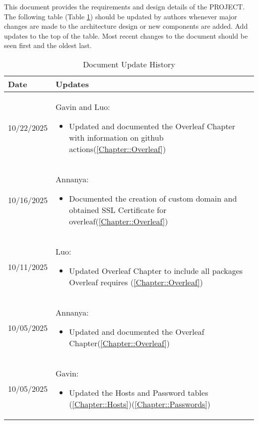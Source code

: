 This document provides the requirements and design details of the
PROJECT.  The following table (Table \ref{Table::UpdateHistory}) should be
updated by authors whenever major changes are made to the architecture
design or new components are added. Add updates to the top of the table.  
Most recent changes to the document should be seen first and the oldest 
last.

\begin{longtable}{|l||p{13.5cm}|}
\caption{Document Update History \label{Table::UpdateHistory}}\\
\hline
\textbf{Date} & \textbf{Updates} \\
\hline 
\endhead

10/22/2025 & Gavin and Luo:
\begin{itemize}[topsep=0pt,itemsep=0pt,parsep=0pt,partopsep=0pt,leftmargin=12pt]
\item Updated and documented the Overleaf Chapter with information on github actions(\ref{Chapter::Overleaf})
\end{itemize} 
\\ \hline

10/16/2025 & Annanya:
\begin{itemize}[topsep=0pt,itemsep=0pt,parsep=0pt,partopsep=0pt,leftmargin=12pt]
\item Documented the creation of custom domain and obtained SSL Certificate for overleaf(\ref{Chapter::Overleaf})
\end{itemize} 
\\ \hline

10/11/2025 & Luo:
\begin{itemize}[topsep=0pt,itemsep=0pt,parsep=0pt,partopsep=0pt,leftmargin=12pt]
\item Updated Overleaf Chapter to include all packages Overleaf requires (\ref{Chapter::Overleaf})
\end{itemize} 
\\ \hline

10/05/2025 & Annanya:
\begin{itemize}[topsep=0pt,itemsep=0pt,parsep=0pt,partopsep=0pt,leftmargin=12pt]
\item Updated and documented the Overleaf Chapter(\ref{Chapter::Overleaf})
\end{itemize} 
\\ \hline

10/05/2025 & Gavin:
\begin{itemize}[topsep=0pt,itemsep=0pt,parsep=0pt,partopsep=0pt,leftmargin=12pt]
\item Updated the Hosts and Password tables (\ref{Chapter::Hosts})(\ref{Chapter::Passwords})
\end{itemize} 
\\ \hline


\end{longtable}
